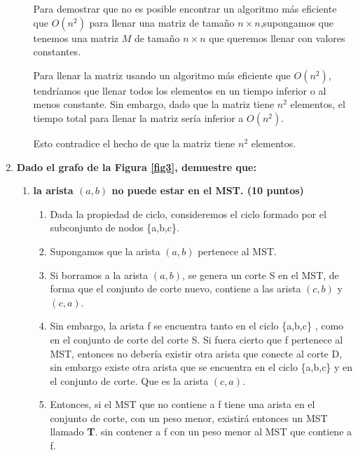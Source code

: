 \documentclass[a4paper,12pt]{article} %
\begin{document}
\begin{enumerate}
\begin{enumerate}
        Para demostrar que no es posible encontrar un algoritmo más eficiente que \( O(n^2) \) para llenar una matriz de tamaño \( n \times n \),supongamos que tenemos una matriz \( M \) de tamaño \( n \times n \) que queremos llenar con valores constantes.
        
        Para llenar la matriz usando un algoritmo más eficiente que \( O(n^2) \), tendríamos que llenar todos los elementos en un tiempo inferior o al menos constante. Sin embargo, dado que la matriz tiene \( n^2 \) elementos, el tiempo total para llenar la matriz sería inferior a \( O(n^2) \).
        
        Esto contradice el hecho de que la matriz tiene \( n^2 \) elementos.
    
    \end{enumerate}

    
    \item \textbf{Dado el grafo de la Figura \ref{fig3}, demuestre que:}
    \begin{enumerate}
        \item \textbf{la arista $(a,b)$ no puede estar en el MST. (\textbf{10 puntos})}\\
        \begin{enumerate}
            \item  Dada la propiedad de ciclo, consideremos el ciclo formado por el subconjunto de nodos \{a,b,c\}.
            \item Supongamos que la arista $(a, b)$ pertenece al MST.

            \item Si borramos a la arista $(a, b)$, se genera un corte S en el MST, de forma que el conjunto de corte nuevo, contiene a las arista $(c,b)$ y $(c,a)$.

            \item Sin embargo, la arista f se encuentra tanto en el ciclo \{a,b,c\}
            , como en el conjunto de corte del corte S. Si fuera cierto que f pertenece al MST, entonces no debería existir otra arista que conecte al corte D, sin embargo existe otra arista que se encuentra en el ciclo \{a,b,c\} y en el conjunto de corte. Que es la arista $(c,a )$.

            \item Entonces, si el MST que no contiene a f tiene una arista en el conjunto de corte, con un peso menor, existirá entonces un MST llamado \textbf{T}. sin contener a f con un peso menor al MST que contiene a f. 


\end{enumerate}
\end{enumerate}
\end{enumerate}
\end{document}

